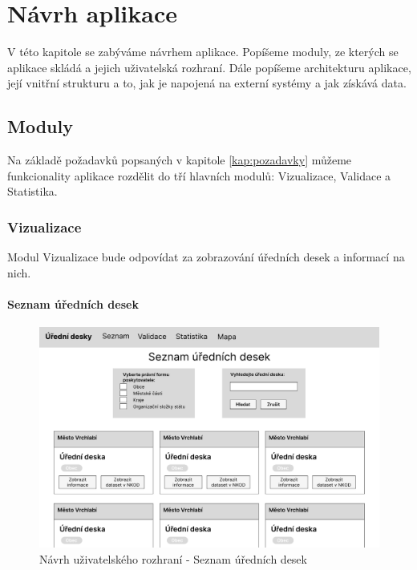 
\chapter{Návrh aplikace}\label{kap:navrh}

V této kapitole se zabýváme návrhem aplikace. Popíšeme moduly, ze kterých se aplikace skládá a jejich uživatelská rozhraní. Dále popíšeme architekturu aplikace, její vnitřní strukturu a to, jak je napojená na externí systémy a jak získává data.

\section{Moduly}\label{sec:moduly}

Na základě požadavků popsaných v kapitole \ref{kap:pozadavky} můžeme funkcionality aplikace rozdělit do tří hlavních modulů: Vizualizace, Validace a Statistika.

\subsection{Vizualizace}

Modul Vizualizace bude odpovídat za zobrazování úředních desek a informací na nich. 

\subsubsection{Seznam úředních desek}

\begin{figure} 
\includegraphics[width=1\textwidth, frame]{cs/obrazky/wireframes/wireframe_seznam.pdf}
\caption{Návrh uživatelského rozhraní - Seznam úředních desek}
\label{fig:seznam}
\end{figure}

